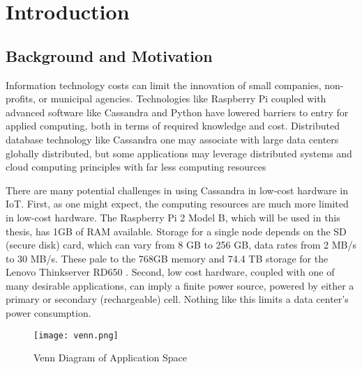 
\chapter{Introduction} %

\label{Chapter1} %


\newcommand{\keyword}[1]{\textbf{#1}}
\newcommand{\tabhead}[1]{\textbf{#1}}
\newcommand{\code}[1]{\texttt{#1}}
\newcommand{\file}[1]{\texttt{\bfseries#1}}
\newcommand{\option}[1]{\texttt{\itshape#1}}


\section{Background and Motivation}
Information technology costs can limit the innovation of small companies, non-profits, or municipal agencies.
Technologies like Raspberry Pi coupled with advanced software like Cassandra and Python have lowered barriers to entry for applied computing, both in terms of required knowledge and cost.
Distributed database technology like Cassandra one may associate with large data centers globally distributed, but some applications may leverage distributed systems and cloud computing principles with far less computing resources

There are many potential challenges in using Cassandra in low-cost hardware in IoT.
First, as one might expect, the computing resources are much more limited in low-cost hardware.
The Raspberry Pi 2 Model B, which will be used in this thesis, has 1GB of RAM available.  Storage for a single node depends on the SD (secure disk) card, which can vary from 8 GB to 256 GB, data rates from 2 MB/s to 30 MB/s.
These pale to the 768GB memory and 74.4 TB storage for the Lenovo Thinkserver RD650 \cite{LENOVORD650}.
Second, low cost hardware, coupled with one of many desirable applications, can imply a finite power source, powered by either a primary or secondary (rechargeable) cell.  Nothing like this limits a data center's power consumption.

\begin{figure}[h]
\texttt{[image: venn.png]}

\caption{Venn Diagram of Application Space}

\label{fig:res}
\end{figure}


